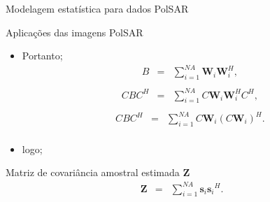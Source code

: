 \documentclass[10pt]{beamer}
\begin{document}
\begin{frame}[fragile]{Modelagem estatística para dados PolSAR}
\begin{alertblock}{Aplicações das imagens PolSAR}
  \begin{itemize}
\item Portanto;
\begin{equation}
\begin{array}{ccc}
    B&=&\displaystyle{\sum_{i=1}^{NA} \mathbf{W}_i\mathbf{W}_i^H}, \\
\end{array}
\end{equation}
\begin{equation}
\begin{array}{ccc}
    CBC^H&=&\displaystyle{\sum_{i=1}^{NA} C\mathbf{W}_i\mathbf{W}_i^HC^H}, \\
\end{array}
\end{equation}
\begin{equation}
\begin{array}{ccc}
    CBC^H&=&\displaystyle{\sum_{i=1}^{NA} C\mathbf{W}_i(C\mathbf{W}_i)^H}. \\
\end{array}
\end{equation}
\item logo;
\end{itemize}
\end{alertblock}
      \alert{Matriz de covariância amostral estimada {\bf Z}}
\begin{equation}
\begin{array}{ccc}
    \mathbf{Z}&=&\displaystyle{\sum_{i=1}^{NA} {\mathbf{s}_i}{\mathbf{s}_i}^H}. \\
\end{array}
\end{equation}
\end{frame}
\end{document}
